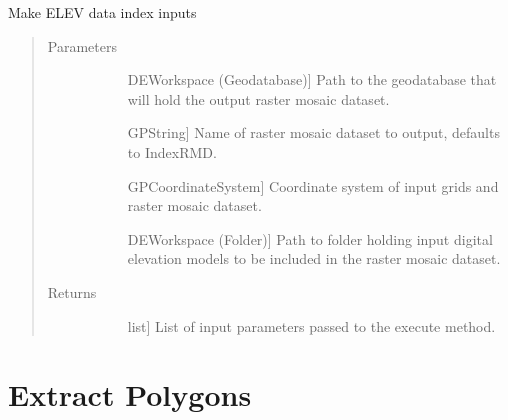 \documentclass[letterpaper,10pt,english]{sphinxmanual}
\begin{document}
\begin{fulllineitems}
\begin{fulllineitems}
\label{\detokenize{StreamStats_DataPrep:StreamStats_DataPrep.makeELEVDATAIndex.getParameterInfo}}
Make ELEV data index inputs
\begin{quote}\begin{description}
\item[{Parameters}] \leavevmode\begin{description}
\item[{}] \leavevmode{[}DEWorkspace (Geodatabase){]}
Path to the geodatabase that will hold the output raster mosaic dataset.

\item[{}] \leavevmode{[}GPString{]}
Name of raster mosaic dataset to output, defaults to IndexRMD.

\item[{}] \leavevmode{[}GPCoordinateSystem{]}
Coordinate system of input grids and raster mosaic dataset.

\item[{}] \leavevmode{[}DEWorkspace (Folder){]}
Path to folder holding input digital elevation models to be included in the raster mosaic dataset.

\end{description}

\item[{Returns}] \leavevmode\begin{description}
\item[{}] \leavevmode{[}list{]}
List of input parameters passed to the execute method.

\end{description}

\end{description}\end{quote}

\end{fulllineitems}


\end{fulllineitems}



\section{Extract Polygons}
\label{\detokenize{StreamStats_DataPrep:extract-polygons}}
\end{document}
